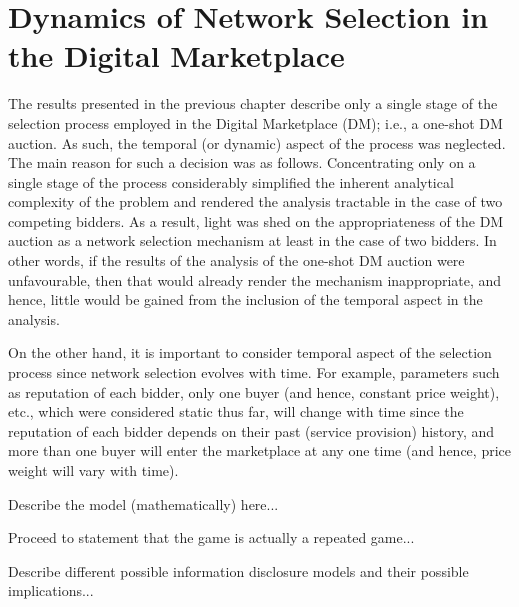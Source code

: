 \chapter{Dynamics of Network Selection in the Digital Marketplace} %
\label{cha:dynamics_of_network_selection_in_the_digital_marketplace}

\minitoc
\vspace{10mm}

The results presented in the previous chapter describe only a single stage of the selection process employed in the Digital Marketplace (DM); i.e., a one-shot DM auction. As such, the temporal (or dynamic) aspect of the process was neglected. The main reason for such a decision was as follows. Concentrating only on a single stage of the process considerably simplified the inherent analytical complexity of the problem and rendered the analysis tractable in the case of two competing bidders. As a result, light was shed on the appropriateness of the DM auction as a network selection mechanism at least in the case of two bidders. In other words, if the results of the analysis of the one-shot DM auction were unfavourable, then that would already render the mechanism inappropriate, and hence, little would be gained from the inclusion of the temporal aspect in the analysis.

On the other hand, it is important to consider temporal aspect of the selection process since network selection evolves with time. For example, parameters such as reputation of each bidder, only one buyer (and hence, constant price weight), etc., which were considered static thus far, will change with time since the reputation of each bidder depends on their past (service provision) history, and more than one buyer will enter the marketplace at any one time (and hence, price weight will vary with time).

Describe the model (mathematically) here...

Proceed to statement that the game is actually a repeated game...

Describe different possible information disclosure models and their possible implications...

